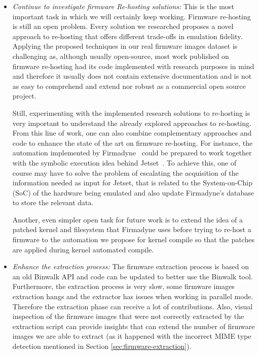 \begin{itemize}
    \item \textit{Continue to investigate firmware Re-hosting solutions:} This is the most important task in which we will certainly keep working. Firmware re-hosting is still an open problem. Every solution we researched proposes a novel approach to re-hosting that offers different trade-offs in emulation fidelity. Applying the proposed techniques in our real firmware images dataset is challenging as, although usually open-source, most work published on firmware re-hosting had its code implemented with research purposes in mind and therefore it usually does not contain extensive documentation and is not as easy to comprehend and extend nor robust as a commercial open source project.
    
    Still, experimenting with the implemented research solutions to re-hosting is very important to understand the already explored approaches to re-hosting. From this line of work, one can also combine complementary approaches and code to enhance the state of the art on firmware re-hosting. For instance, the automation implemented by Firmadyne~\cite{firmadyne} could be prepared to work together with the symbolic execution idea behind Jetset~\cite{jetset}. To achieve this, one of course may have to solve the problem of escalating the acquisition of the information needed as input for Jetset, that is related to the System-on-Chip (SoC) of the hardware being emulated and also update Firmadyne's database to store the relevant data.
    
    Another, even simpler open task for future work is to extend the idea of a patched kernel and filesystem that Firmadyne uses before trying to re-host a firmware to the automation we propose for kernel compile so that the patches are applied during kernel automated compile.
    
    \item \textit{Enhance the extraction process:} The firmware extraction process is based on an old Binwalk API and code can be updated to better use the Binwalk tool. Furthermore, the extraction process is very slow, some firmware images extraction hangs and the extractor has issues when working in parallel mode. Therefore the extraction phase can receive a lot of contributions. Also, visual inspection of the firmware images that were not correctly extracted by the extraction script can provide insights that can extend the number of firmware images we are able to extract (as it happened with the incorrect MIME type detection mentioned in Section \ref{sec:firmware-extraction}).
    

\end{itemize}

